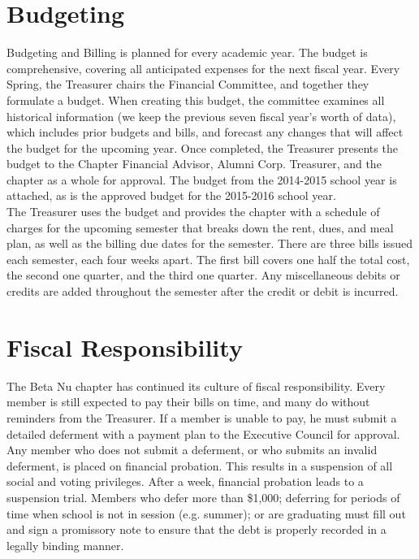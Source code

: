   \section*{Budgeting}
    Budgeting and Billing is planned for every academic year. The budget is comprehensive, covering all anticipated expenses for the next fiscal year. Every Spring, the Treasurer chairs the Financial Committee, and together they formulate a budget. When creating this budget, the committee examines all historical information (we keep the previous seven fiscal year’s worth of data), which includes prior budgets and bills, and forecast any changes that will affect the budget for the upcoming year. Once completed, the Treasurer presents the budget to the Chapter Financial Advisor, Alumni Corp. Treasurer, and the chapter as a whole for approval. The budget from the 2014-2015 school year is attached, as is the approved budget for the 2015-2016 school year. \\

    The Treasurer uses the budget and provides the chapter with a schedule of charges for the upcoming semester that breaks down the rent, dues, and meal plan, as well as the billing due dates for the semester. There are three bills issued each semester, each four weeks apart. The first bill covers one half the total cost, the second one quarter, and the third one quarter. Any miscellaneous debits or credits are added throughout the semester after the credit or debit is incurred.
    
  \section*{Fiscal Responsibility}
  
    The Beta Nu chapter has continued its culture of fiscal responsibility. Every member is still expected to pay their bills on time, and many do without reminders from the Treasurer. If a member is unable to pay, he must submit a detailed deferment with a payment plan to the Executive Council for approval. Any member who does not submit a deferment, or who submits an invalid deferment, is placed on financial probation. This results in a suspension of all social and voting privileges. After a week, financial probation leads to a suspension trial. Members who defer more than \$1,000; deferring for periods of time when school is not in session (e.g. summer); or are graduating must fill out and sign a promissory note to ensure that the debt is properly recorded in a legally binding manner. \\

